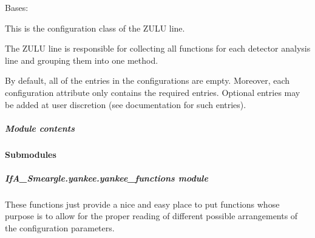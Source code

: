\documentclass[letterpaper,10pt,english]{sphinxmanual}
\begin{document}
\begin{fulllineitems}
\label{\detokenize{python_docstrings/IfA_Smeargle.yankee.configuration_classes.ZuluConfig_file:IfA_Smeargle.yankee.configuration_classes.ZuluConfig_file.ZuluConfig}}
Bases: {\hyperref[\detokenize{python_docstrings/IfA_Smeargle.yankee.configuration_classes.BaseConfig_file:IfA_Smeargle.yankee.configuration_classes.BaseConfig_file.BaseConfig}]{}}

This is the configuration class of the ZULU line.

The ZULU line is responsible for collecting all functions for each
detector analysis line and grouping them into one method.

By default, all of the entries in the configurations are empty. Moreover,
each configuration attribute only contains the required entries. Optional
entries may be added at user discretion (see documentation for such
entries).

\end{fulllineitems}



\subparagraph{Module contents}
\label{\detokenize{python_docstrings/IfA_Smeargle.yankee.configuration_classes:module-IfA_Smeargle.yankee.configuration_classes}}\label{\detokenize{python_docstrings/IfA_Smeargle.yankee.configuration_classes:module-contents}}

\paragraph{Submodules}
\label{\detokenize{python_docstrings/IfA_Smeargle.yankee:submodules}}

\subparagraph{IfA\_Smeargle.yankee.yankee\_functions module}
\label{\detokenize{python_docstrings/IfA_Smeargle.yankee.yankee_functions:module-IfA_Smeargle.yankee.yankee_functions}}\label{\detokenize{python_docstrings/IfA_Smeargle.yankee.yankee_functions:ifa-smeargle-yankee-yankee-functions-module}}\label{\detokenize{python_docstrings/IfA_Smeargle.yankee.yankee_functions::doc}}
These functions just provide a nice and easy place to put functions whose
purpose is to allow for the proper reading of different possible arrangements
of the configuration parameters.
\end{document}
